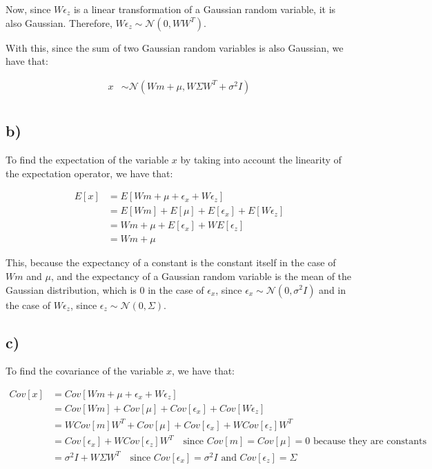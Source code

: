 \documentclass[12pt,a4paper,oneside]{paper}
\begin{document}
Now, since \( W\epsilon_z \) is a linear transformation of a Gaussian random variable, it is also Gaussian.
Therefore, \( W\epsilon_z \sim \mathcal{N}(0, WW^T) \). 

With this, since the sum of two Gaussian random variables is also Gaussian, we have that:

\begin{align*}
    x &\sim \mathcal{N}(Wm + \mu, W \Sigma W^T + \sigma^2 I) \\
\end{align*}

\subsection*{b)}

To find the expectation of the variable $x$ by taking into account the linearity of the expectation operator, we have that:

\begin{align*}
    E[x] &= E[Wm + \mu + \epsilon_x + W\epsilon_z] \\
    &= E[Wm] + E[\mu] + E[\epsilon_x] + E[W\epsilon_z] \\
    &= Wm + \mu + E[\epsilon_x] + W E[\epsilon_z] \\
    &= Wm + \mu
\end{align*}

This, because the expectancy of a constant is the constant itself in the case of $Wm$ and $\mu$, and the expectancy of a Gaussian random variable is the mean of the Gaussian distribution,
which is 0 in the case of $\epsilon_x$, since $\epsilon_x \sim \mathcal{N}(0, \sigma^2 I)$ and in the case of $W\epsilon_z$, since $\epsilon_z \sim \mathcal{N}(0, \Sigma)$.

\subsection*{c)}

To find the covariance of the variable $x$, we have that:

\begin{align*}
    Cov[x] &= Cov[Wm + \mu + \epsilon_x + W\epsilon_z] \\
    &= Cov[Wm] + Cov[\mu] + Cov[\epsilon_x] + Cov[W\epsilon_z] \\
    &= W Cov[m] W^T + Cov[\mu] + Cov[\epsilon_x] + W Cov[\epsilon_z] W^T \\
    &= Cov[\epsilon_x] + W Cov[\epsilon_z] W^T \quad \text{since $Cov[m] = Cov[\mu] = 0$ because they are constants} \\
    &= \sigma^2 I + W \Sigma W^T \quad \text{since $Cov[\epsilon_x] = \sigma^2 I$ and $Cov[\epsilon_z] = \Sigma$}
\end{align*}
\end{document}
